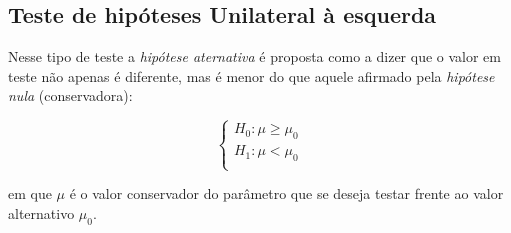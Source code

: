\documentclass[
]{book}
\begin{document}
\hypertarget{teste-de-hipuxf3teses-unilateral-uxe0-esquerda}{%
\subsection{Teste de hipóteses Unilateral à esquerda}\label{teste-de-hipuxf3teses-unilateral-uxe0-esquerda}}

Nesse tipo de teste a \emph{hipótese aternativa} é proposta como a dizer que o valor em teste não apenas é diferente, mas é menor do que aquele afirmado pela \emph{hipótese nula} (conservadora):

\hfill\break

\[
\begin{cases}
    H_{0}: \mu \ge \mu_{0}\\
    H_{1}: \mu < \mu_{0}\\
\end{cases}
\]

\hfill\break

em que \(\mu\) é o valor conservador do parâmetro que se deseja testar frente ao valor alternativo \(\mu_{0}\).

\hfill\break
\end{document}
